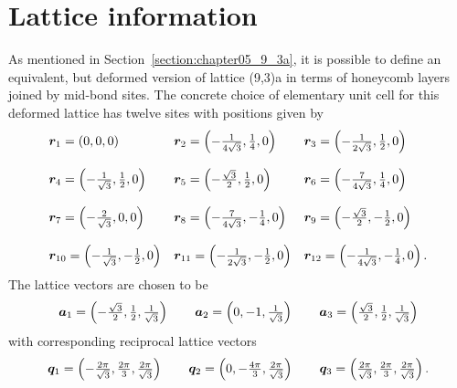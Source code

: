 %
%
\section{Lattice information}
\label{section:chapter06_Lattice}
%
%
As mentioned in Section~\ref{section:chapter05_9_3a}, it is possible to define an equivalent, but deformed version of lattice (9,3)a in terms of honeycomb layers joined by mid-bond sites.
The concrete choice of elementary unit cell for this deformed lattice has twelve sites with positions given by
%
\begin{equation}
	\begin{matrix*}[l]
		\br_1 = \left(0, 0, 0\right) &
		\br_2 = \left(-\frac{1}{4\sqrt{3}}, \frac{1}{4}, 0\right) &
		\br_3 = \left(-\frac{1}{2\sqrt{3}}, \frac{1}{2}, 0\right) \\
		&\\
		\br_4 = \left(-\frac{1}{\sqrt{3}}, \frac{1}{2}, 0\right) &
		\br_5 = \left(-\frac{\sqrt{3}}{2}, \frac{1}{2}, 0\right) &
		\br_6 = \left(-\frac{7}{4\sqrt{3}}, \frac{1}{4}, 0\right) \\
		&\\
		\br_7 = \left(-\frac{2}{\sqrt{3}}, 0, 0\right) &
		\br_8 = \left(-\frac{7}{4\sqrt{3}}, -\frac{1}{4}, 0\right) &
		\br_9 = \left(-\frac{\sqrt{3}}{2}, -\frac{1}{2}, 0\right) \\
		&\\
		\br_{10} = \left(-\frac{1}{\sqrt{3}}, -\frac{1}{2}, 0\right) &
		\br_{11} = \left(-\frac{1}{2\sqrt{3}}, -\frac{1}{2}, 0\right) &
		\br_{12} = \left(-\frac{1}{4\sqrt{3}}, -\frac{1}{4}, 0\right).
	\end{matrix*}
\end{equation}
%
The lattice vectors are chosen to be
%
\begin{equation}
	\begin{matrix*}[l]
		\ba_1 = \left(-\frac{\sqrt{3}}{2}, \frac{1}{2}, \frac{1}{\sqrt{3}}\right) \qquad
		\ba_2 = \left(0, -1, \frac{1}{\sqrt{3}}\right) \qquad
		\ba_3 = \left(\frac{\sqrt{3}}{2}, \frac{1}{2}, \frac{1}{\sqrt{3}}\right)
	\end{matrix*}
\end{equation}
%
with corresponding reciprocal lattice vectors
%
\begin{equation}
	\begin{matrix*}[l]
		\bq_1 = \left(-\frac{2\pi}{\sqrt{3}}, \frac{2\pi}{3}, \frac{2\pi}{\sqrt{3}}\right) \qquad
		\bq_2 = \left(0, -\frac{4\pi}{3}, \frac{2\pi}{\sqrt{3}}\right) \qquad
		\bq_3 = \left(\frac{2\pi}{\sqrt{3}}, \frac{2\pi}{3}, \frac{2\pi}{\sqrt{3}}\right).
	\end{matrix*}
\end{equation}
%


